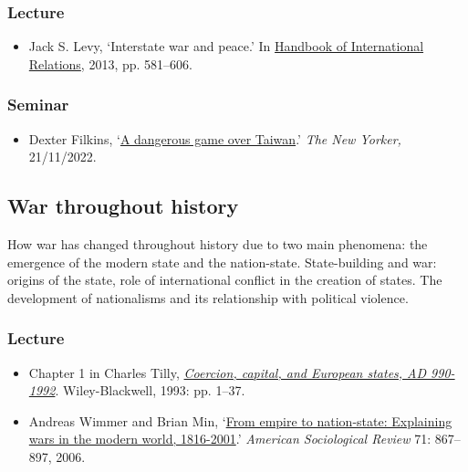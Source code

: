 \documentclass[12pt, a4paper]{article}
\begin{document}
\subsubsection*{Lecture}

\begin{itemize}
\setlength\itemsep{0pt}
\item Jack S. Levy, `Interstate war and peace.' In \href{https://uk.sagepub.com/en-gb/eur/handbook-of-international-relations/book234093}{Handbook of International Relations}, 2013, pp. 581--606.
\end{itemize}

\subsubsection*{Seminar}

\begin{itemize}
\setlength\itemsep{0pt}
\item Dexter Filkins, `\href{https://www.newyorker.com/magazine/2022/11/21/a-dangerous-game-over-taiwan}{A dangerous game over Taiwan}.' \textit{The New Yorker,} 21/11/2022.
\end{itemize}

\hline %

\subsection{War throughout history}\label{war_history}

How war has changed throughout history due to two main phenomena: the emergence of the modern state and the nation-state. State-building and war: origins of the state, role of international conflict in the creation of states. The development of nationalisms and its relationship with political violence.

\subsubsection*{Lecture}

\begin{itemize}
\setlength\itemsep{0pt}
\item Chapter 1 in Charles Tilly, \href{https://www.wiley.com/en-us/Coercion%2C+Capital+and+European+States%2C+A+D+990+1992-p-9781557863683}{\textit{Coercion, capital, and European states, AD 990-1992}}. Wiley-Blackwell, 1993: pp. 1--37.
\item Andreas Wimmer and Brian Min, `\href{https://doi.org/10.1177/000312240607100601}{From empire to nation-state: Explaining wars in the modern world, 1816-2001}.' \textit{American Sociological Review} 71: 867--897, 2006.
\end{itemize}
\end{document}
